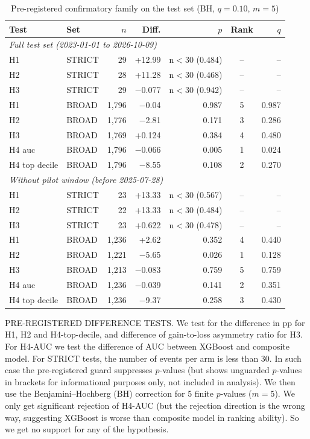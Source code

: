 \documentclass[conference]{IEEEtran}
\begin{document}
\begin{table}[t]
\centering
\caption{Pre-registered confirmatory family on the test set (BH, $q=0.10$, $m=5$)}
\label{tab:confirm}
\footnotesize
\setlength{\tabcolsep}{4pt}
\begin{tabular}{llrrrcr}
\toprule
\textbf{Test} & \textbf{Set} & $n$ & \textbf{Diff.} & $p$ & \textbf{Rank} & $q$ \\
\midrule
\multicolumn{7}{l}{\textit{Full test set (2023-01-01 to 2026-10-09)}} \\
H1 & STRICT & 29 & +12.99 & n$<$30 (0.484) & -- & -- \\
H2 & STRICT & 28 & +11.28 & n$<$30 (0.468) & -- & -- \\
H3 & STRICT & 29 & \ensuremath{-}0.077 & n$<$30 (0.942) & -- & -- \\
H1 & BROAD & 1,796 & \ensuremath{-}0.04 & 0.987 & 5 & 0.987 \\
H2 & BROAD & 1,776 & \ensuremath{-}2.81 & 0.171 & 3 & 0.286 \\
H3 & BROAD & 1,769 & +0.124 & 0.384 & 4 & 0.480 \\
H4 auc & BROAD & 1,796 & \ensuremath{-}0.066 & 0.005 & 1 & 0.024 \\
H4 top decile & BROAD & 1,796 & \ensuremath{-}8.55 & 0.108 & 2 & 0.270 \\
\midrule
\multicolumn{7}{l}{\textit{Without pilot window (before 2025-07-28)}} \\
H1 & STRICT & 23 & +13.33 & n$<$30 (0.567) & -- & -- \\
H2 & STRICT & 22 & +13.33 & n$<$30 (0.484) & -- & -- \\
H3 & STRICT & 23 & +0.622 & n$<$30 (0.478) & -- & -- \\
H1 & BROAD & 1,236 & +2.62 & 0.352 & 4 & 0.440 \\
H2 & BROAD & 1,221 & \ensuremath{-}5.65 & 0.026 & 1 & 0.128 \\
H3 & BROAD & 1,213 & \ensuremath{-}0.083 & 0.759 & 5 & 0.759 \\
H4 auc & BROAD & 1,236 & \ensuremath{-}0.039 & 0.141 & 2 & 0.351 \\
H4 top decile & BROAD & 1,236 & \ensuremath{-}9.37 & 0.258 & 3 & 0.430 \\
\bottomrule
\end{tabular}
\par\smallskip\parbox{0.98\linewidth}{\scriptsize\raggedright PRE-REGISTERED DIFFERENCE TESTS. We test for the difference in pp for H1, H2 and H4-top-decile, and difference of gain-to-loss asymmetry ratio for H3. For H4-AUC we test the difference of AUC between XGBoost and composite model. For STRICT tests, the number of events per arm is less than 30. In such case the pre-registered guard suppresses $p$-values (but shows unguarded $p$-values in brackets for informational purposes only, not included in analysis). We then use the Benjamini--Hochberg (BH) correction for 5 finite $p$-values ($m=5$). We only get significant rejection of H4-AUC (but the rejection direction is the wrong way, suggesting XGBoost is worse than composite model in ranking ability). So we get no support for any of the hypothesis.}
\end{table}
\end{document}
